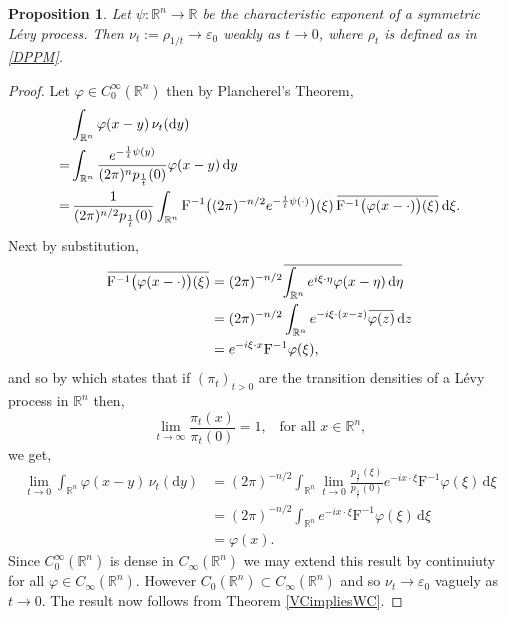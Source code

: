 \documentclass[a4paper, 12pt]{report}
\theoremstyle{cor}
\newtheorem{prop}[theorem]{Proposition}
\theoremstyle{remark}
\theoremstyle{definition}
\newcommand{\overbar}[1]{\mkern 1.5mu\overline{\mkern-1.5mu#1\mkern-1.5mu}\mkern 1.5mu}
\begin{document}
\begin{prop}\label{SharedPropWithNiels}
Let $\psi : \mathbb{R}^n \to \mathbb{R}$ be the characteristic exponent of a symmetric L\'evy process.  Then $\nu_t := \rho_{1/t} \to \varepsilon_0$ weakly as $t \to 0$, where $\rho_t$ is defined as in \eqref{DPPM}.
\end{prop}
\begin{proof}
Let $\varphi \in C_0^\infty(\mathbb{R}^n)$ then by Plancherel's Theorem,
$$
\begin{aligned}
& \int_{\mathbb{R}^n}\varphi(x - y)\,\nu_t(\mathrm{d}y)\\
= & \int_{\mathbb{R}^n}\frac{e^{-\frac{1}{t}\psi(y)}}{(2\pi)^np_\frac{1}{t}(0)}\varphi(x - y)\,\mathrm{d}y\\
= & \, \frac{1}{(2\pi)^{n/2}p_\frac{1}{t}(0)}\int_{\mathbb{R}^n}\mathrm{F}^{-1}\big((2\pi)^{-n/2}e^{-\frac{1}{t}\psi(\cdot)}\big)(\xi)\,\overbar{\mathrm{F}^{-1}\big(\varphi(x - \cdot)\big)(\xi)}\,\mathrm{d}\xi.
\end{aligned}
$$
Next by substitution,
$$
\begin{aligned}
\overbar{\mathrm{F}^{-1}\big(\varphi(x - \cdot)\big)(\xi)} & = (2\pi)^{-n/2}\overbar{\int_{\mathbb{R}^n}e^{i\xi\cdot\eta}\varphi(x - \eta)\,\mathrm{d}\eta}\\
& = (2\pi)^{-n/2}\int_{\mathbb{R}^n}e^{-i\xi\cdot(x - z)}\overbar{\varphi(z)}\,\mathrm{d}z\\
& = e^{-i\xi\cdot x}\mathrm{F}^{-1}\varphi(\xi),
\end{aligned}
$$
and so by \cite[Theorem 14]{DProofPaper} which states that if $(\pi_t)_{t > 0}$ are the transition densities of a L\'evy process in $\mathbb{R}^n$ then,
$$
\lim_{t \to \infty}\frac{\pi_t(x)}{\pi_t(0)} = 1, \,\,\,\,\, \text{for all} \,\, x \in \mathbb{R}^n,
$$
we get,
$$
\begin{aligned}
\lim_{t \to 0}\int_{\mathbb{R}^n}\varphi(x - y)\,\nu_t(\mathrm{d}y) & = (2\pi)^{-n/2}\int_{\mathbb{R}^n}\lim_{t \to 0}\frac{p_\frac{1}{t}(\xi)}{p_\frac{1}{t}(0)}e^{-ix\cdot\xi}\mathrm{F}^{-1}\varphi(\xi)\,\mathrm{d}\xi\\
& = (2\pi)^{-n/2}\int_{\mathbb{R}^n}e^{-ix\cdot\xi}\mathrm{F}^{-1}\varphi(\xi)\,\mathrm{d}\xi\\
& = \varphi(x).
\end{aligned}
$$
Since $C_0^\infty(\mathbb{R}^n)$ is dense in $C_\infty(\mathbb{R}^n)$ we may extend this result by continuiuty for all $\varphi \in C_\infty(\mathbb{R}^n)$.  However $C_0(\mathbb{R}^n) \subset C_\infty(\mathbb{R}^n)$ and so $\nu_t \to \varepsilon_0$ vaguely as $t \to 0$.  The result now follows from Theorem \ref{VCimpliesWC}.
\end{proof}
\end{document}
